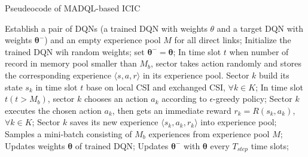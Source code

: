 \documentclass{article}
\begin{document}
\renewcommand{\algorithmicrequire}{\textbf{Input:}}  %
\renewcommand{\algorithmicensure}{\textbf{Output:}} %
\begin{algorithm}[h]
	\caption{Pseudeocode of MADQL-based ICIC} 
	\label{alg}
	\begin{algorithmic}[1]
		\State Establish a pair of DQNs (a trained DQN with weights $\theta$ and a target DQN with weights $\bm{\theta}^-$) and an empty experience pool $M$ for all direct links;
		\State Initialize the trained DQN wih random weights; set $\bm{\theta}^-=\bm{\theta}$;
		\State In time slot $t$ when number of record in memory pool smaller than $M_b$, sector takes action randomly and stores the corresponding experience $\langle s, a, r \rangle$ in its experience pool.
		\Repeat
		\State Sector $k$ build its state $s_k$ in time slot $t$ base on local CSI and exchanged CSI, $\forall k \in K$;
		\State In time slot $t(t>M_b)$, sector $k$ chooses an action $a_k$ according to $\epsilon$-greedy policy; 
		\State Sector $k$ executes the chosen action $a_k$, then gets an immediate reward $r_k=R(s_k, a_k)$, $\forall k \in K$;
		\State Sector $k$ saves its new experience $\langle s_k, a_k, r_k \rangle$ into experience pool;
		\State Samples a mini-batch consisting of $M_b$ experiences from experience pool $M$;
		\State Updates weights $\bm{\theta}$ of trained DQN;
		\State Updates $\bm{\theta}^-$ with $\bm{\theta}$ every $T_{step}$ time slots;
	\end{algorithmic}
\end{algorithm}
\end{document}
